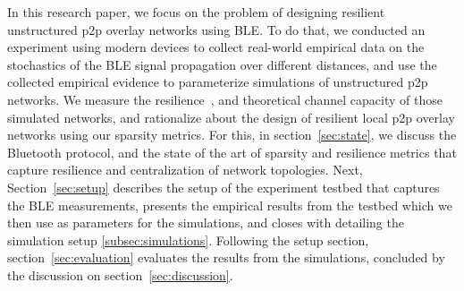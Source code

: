 In this research paper, we focus on the problem of designing resilient unstructured p2p overlay networks using BLE. To do that, we conducted an experiment using modern devices to collect real-world empirical data on the stochastics of the BLE signal propagation over different distances, and use the collected empirical evidence to parameterize simulations of unstructured p2p networks.
We measure the resilience~\cite{sparsity,dependence}, and theoretical channel capacity of those simulated networks, and rationalize about the design of resilient local p2p overlay networks using our sparsity metrics.
For this, in section~\ref{sec:state}, we discuss the Bluetooth protocol, and the state of the art of sparsity and resilience metrics that capture resilience and centralization of network topologies.
Next, Section~\ref{sec:setup} describes the setup of the experiment testbed that captures the BLE measurements, presents the empirical results from the testbed which we then use as parameters for the simulations, and closes with detailing the simulation setup \ref{subsec:simulations}.
Following the setup section, section~\ref{sec:evaluation} evaluates the results from the simulations, concluded by the discussion on section~\ref{sec:discussion}.